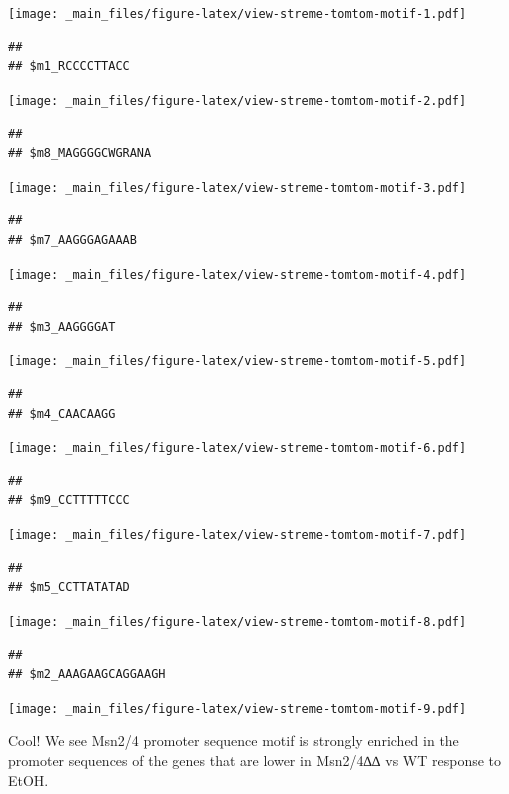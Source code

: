 \documentclass[
]{book}
\begin{document}
\texttt{[image: \_main\_files/figure-latex/view-streme-tomtom-motif-1.pdf]}

\begin{verbatim}
## 
## $m1_RCCCCTTACC
\end{verbatim}

\texttt{[image: \_main\_files/figure-latex/view-streme-tomtom-motif-2.pdf]}

\begin{verbatim}
## 
## $m8_MAGGGGCWGRANA
\end{verbatim}

\texttt{[image: \_main\_files/figure-latex/view-streme-tomtom-motif-3.pdf]}

\begin{verbatim}
## 
## $m7_AAGGGAGAAAB
\end{verbatim}

\texttt{[image: \_main\_files/figure-latex/view-streme-tomtom-motif-4.pdf]}

\begin{verbatim}
## 
## $m3_AAGGGGAT
\end{verbatim}

\texttt{[image: \_main\_files/figure-latex/view-streme-tomtom-motif-5.pdf]}

\begin{verbatim}
## 
## $m4_CAACAAGG
\end{verbatim}

\texttt{[image: \_main\_files/figure-latex/view-streme-tomtom-motif-6.pdf]}

\begin{verbatim}
## 
## $m9_CCTTTTTCCC
\end{verbatim}

\texttt{[image: \_main\_files/figure-latex/view-streme-tomtom-motif-7.pdf]}

\begin{verbatim}
## 
## $m5_CCTTATATAD
\end{verbatim}

\texttt{[image: \_main\_files/figure-latex/view-streme-tomtom-motif-8.pdf]}

\begin{verbatim}
## 
## $m2_AAAGAAGCAGGAAGH
\end{verbatim}

\texttt{[image: \_main\_files/figure-latex/view-streme-tomtom-motif-9.pdf]}

Cool! We see Msn2/4 promoter sequence motif is strongly enriched in the
promoter sequences of the genes that are lower in Msn2/4∆∆ vs WT
response to EtOH.
\end{document}
